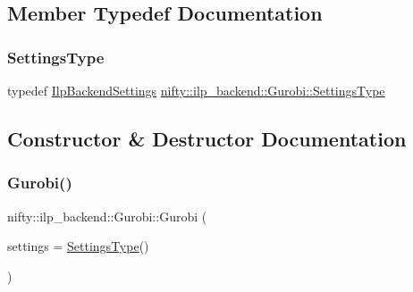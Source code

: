 \subsection{Member Typedef Documentation}
\mbox{\label{classnifty_1_1ilp__backend_1_1Gurobi_a452f0f9dbcdf6bf9741607e9561fa3c5}} 
\subsubsection{\texorpdfstring{Settings\+Type}{SettingsType}}
{\footnotesize\ttfamily typedef \hyperlink{structnifty_1_1ilp__backend_1_1IlpBackendSettings}{Ilp\+Backend\+Settings} \hyperlink{classnifty_1_1ilp__backend_1_1Gurobi_a452f0f9dbcdf6bf9741607e9561fa3c5}{nifty\+::ilp\+\_\+backend\+::\+Gurobi\+::\+Settings\+Type}}



\subsection{Constructor \& Destructor Documentation}
\mbox{\label{classnifty_1_1ilp__backend_1_1Gurobi_ad1fe3b5d2314c16f2a334d13e7abda8f}} 
\subsubsection{\texorpdfstring{Gurobi()}{Gurobi()}}
{\footnotesize\ttfamily nifty\+::ilp\+\_\+backend\+::\+Gurobi\+::\+Gurobi (\begin{DoxyParamCaption}\item[{const \hyperlink{classnifty_1_1ilp__backend_1_1Gurobi_a452f0f9dbcdf6bf9741607e9561fa3c5}{Settings\+Type} \&}]{settings = {\ttfamily \hyperlink{classnifty_1_1ilp__backend_1_1Gurobi_a452f0f9dbcdf6bf9741607e9561fa3c5}{Settings\+Type}()} }\end{DoxyParamCaption})\hspace{0.3cm}{\ttfamily [inline]}}

\mbox{\label{classnifty_1_1ilp__backend_1_1Gurobi_ab8e373ce16adba177e9341a2d0e55157}} 
